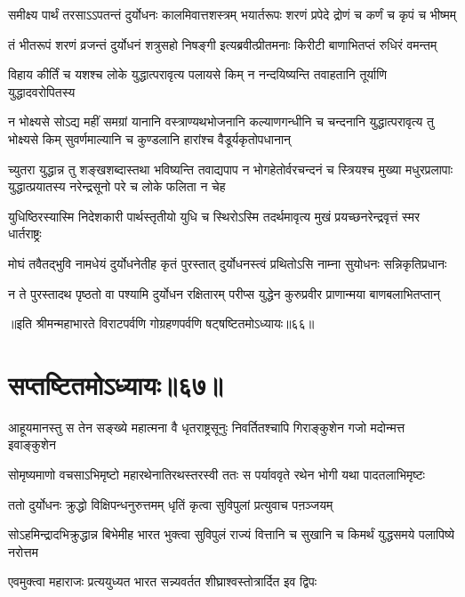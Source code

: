 \twolineshloka
{समीक्ष्य पार्थं तरसाऽऽपतन्तं दुर्योधनः कालमिवात्तशस्त्रम्}
{भयार्तरूपः शरणं प्रपेदे द्रोणं च कर्णं च कृपं च भीष्मम्}


\twolineshloka
{तं भीतरूपं शरणं व्रजन्तं दुर्योधनं शत्रुसहो निषङ्गी}
{इत्यब्रवीत्प्रीतमनाः किरीटी बाणाभितप्तं रुधिरं वमन्तम्}


\twolineshloka
{विहाय कीर्तिं च यशश्च लोके युद्धात्परावृत्य पलायसे किम्}
{न नन्दयिष्यन्ति तवाहतानि तूर्याणि युद्धादवरोपितस्य}


\threelineshloka
{न भोक्ष्यसे सोऽद्य महीं समग्रां यानानि वस्त्राण्यथभोजनानि}
{कल्याणगन्धीनि च चन्दनानि युद्धात्परावृत्य तु भोक्ष्यसे किम्}
{सुवर्णमाल्यानि च कुण्डलानि हारांश्च वैडूर्यकृतोपधानान्}


\threelineshloka
{च्युतरा युद्धान्न तु शङ्खशब्दास्तथा भविष्यन्ति तवाद्यपाप}
{न भोगहेतोर्वरचन्दनं च स्त्रियश्च मुख्या मधुरप्रलापाः}
{युद्धात्प्रयातस्य नरेन्द्रसूनो परे च लोके फलिता न चेह}


\twolineshloka
{युधिष्ठिरस्यास्मि निदेशकारी पार्थस्तृतीयो युधि च स्थिरोऽस्मि}
{तदर्थमावृत्य मुखं प्रयच्छनरेन्द्रवृत्तं स्मर धार्तराष्ट्रः}


\twolineshloka
{मोघं तवैतद्भुवि नामधेयं दुर्योधनेतीह कृतं पुरस्तात्}
{दुर्योधनस्त्वं प्रथितोऽसि नाम्ना सुयोधनः सन्निकृतिप्रधानः}



\twolineshloka
{न ते पुरस्तादथ पृष्ठतो वा पश्यामि दुर्योधन रक्षितारम्}
{परीप्स युद्धेन कुरुप्रवीर प्राणान्मया बाणबलाभितप्तान्}

॥इति श्रीमन्महाभारते विराटपर्वणि गोग्रहणपर्वणि षट्षष्टितमोऽध्यायः॥६६॥

\chapter{सप्तष्टितमोऽध्यायः॥६७॥}
\fourlineindentedshloka
{आहूयमानस्तु स तेन सङ्ख्ये}
{महात्मना वै धृतराष्ट्रसूनुः}
{निवर्तितश्चापि गिराङ्कुशेन}
{गजो मदोन्मत्त इवाङ्कुशेन}


\twolineshloka
{सोमृष्यमाणो वचसाऽभिमृष्टो महारथेनातिरथस्तरस्वी}
{ततः स पर्याववृते रथेन भोगी यथा पादतलाभिमृष्टः}


\twolineshloka
{ततो दुर्योधनः क्रुद्धो विक्षिपन्धनुरुत्तमम्}
{धृतिं कृत्वा सुविपुलां प्रत्युवाच पऩञ्जयम्}


\threelineshloka
{सोऽहमिन्द्रादभिक्रुद्धान्न बिभेमीह भारत}
{भुक्त्वा सुविपुलं राज्यं वित्तानि च सुखानि च}
{किमर्थं युद्धसमये पलापिष्ये नरोत्तम}


\twolineshloka
{एवमुक्त्वा महाराजः प्रत्ययुध्यत भारत}
{सन्न्यवर्तत शीघ्राश्वस्तोत्रार्दित इव द्विपः}


